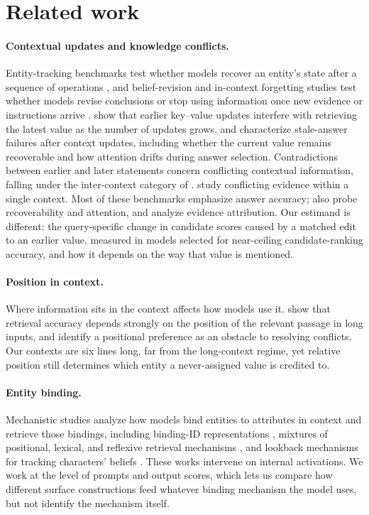 \section{Related work}
\label{sec:related}

\paragraph{Contextual updates and knowledge conflicts.} Entity-tracking benchmarks test whether models recover an entity's state after a sequence of operations \citep{kim2023entity,tang2026entities}, and belief-revision and in-context forgetting studies test whether models revise conclusions or stop using information once new evidence or instructions arrive \citep{wilie2024belief,qian2026forget}. \citet{wang2025unable} show that earlier key--value updates interfere with retrieving the latest value as the number of updates grows, and \citet{guo2026context} characterize stale-answer failures after context updates, including whether the current value remains recoverable and how attention drifts during answer selection. Contradictions between earlier and later statements concern conflicting contextual information, falling under the inter-context category of \citet{xu2024conflicts}. \citet{yang2026conflicts} study conflicting evidence within a single context. Most of these benchmarks emphasize answer accuracy; \citet{guo2026context} also probe recoverability and attention, and \citet{yang2026conflicts} analyze evidence attribution. Our estimand is different: the query-specific change in candidate scores caused by a matched edit to an earlier value, measured in models selected for near-ceiling candidate-ranking accuracy, and how it depends on the way that value is mentioned.

\paragraph{Position in context.} Where information sits in the context affects how models use it. \citet{liu2024lost} show that retrieval accuracy depends strongly on the position of the relevant passage in long inputs, and \citet{yang2026conflicts} identify a positional preference as an obstacle to resolving conflicts. Our contexts are six lines long, far from the long-context regime, yet relative position still determines which entity a never-assigned value is credited to.

\paragraph{Entity binding.} Mechanistic studies analyze how models bind entities to attributes in context and retrieve those bindings, including binding-ID representations \citep{feng2024bind}, mixtures of positional, lexical, and reflexive retrieval mechanisms \citep{gurarieh2026mixing}, and lookback mechanisms for tracking characters' beliefs \citep{prakash2026lookbacks}. These works intervene on internal activations. We work at the level of prompts and output scores, which lets us compare how different surface constructions feed whatever binding mechanism the model uses, but not identify the mechanism itself.

